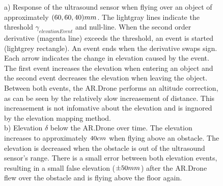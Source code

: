 \begin{figure}[htb!]
  \begin{center}
 \end{center}
\caption{a) Response of the ultrasound sensor when flying over an object of approximately $(60,60,40)\small{mm}$. The lightgray lines indicate the threshold $\gamma_{elevationEvent}$ and null-line. When the second order derivative (magenta line) exceeds the threshold, an event is started (lightgrey rectangle). An event ends when the derivative swaps sign. Each arrow indicates the change in elevation caused by the event. The first event increases the elevation when entering an object and the second event decreases the elevation when leaving the object.
Between both events, the AR.Drone performs an altitude correction, as can be seen by the relatively slow increasement of distance. This increasement is not infomative about the elevation and is ingnored by the elevation mapping method.\\ b) Elevation $\delta$ below the AR.Drone over time. The elevation increases to approximately $40\small{cm}$ when flying above an obstacle. The elevation is decreased when the obstacle is out of the ultrasound sensor's range. There is a small error between both elevation events, resulting in a small false elevation ($\pm 50\small{mm}$) after the AR.Drone flew over the obstacle and is flying above the floor again.}
  \label{visual-slam-elevation-method}
\end{figure}

